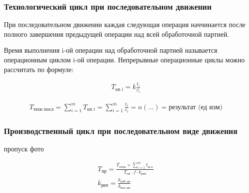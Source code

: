\documentclass[14pt,a4paper,oneside]{extarticle}
\begin{document}
\subsubsection{Технологический цикл при последовательном движении}

При последовательном движении каждая следующая операция наччинается после полного завершения предыдущей операции над всей обработочной партией.

Время выполнения i-ой операции над обработочной партией называется операционным циклом i-ой операции. Непрерывные операционные циклы можно рассчитать по формуле:

\begin{gather*}
    T_\text{оп i}=k\frac{t_i}{c_i}
\end{gather*}

\begin{gather*}
    T_\text{техн посл}=\sum_{i=1}^{m}T_\text{оп i}=\sum_{i=1}^{m}\frac{t_i}{c_i}=n(\ldots)=\text{результат (ед изм)}
\end{gather*}

\subsubsection{Производственный цикл при последовательном виде движения}

пропуск фото

\begin{gather*}
    T_\text{пр}=\frac{T_\text{техн}+\sum_{i=1}^{m}t_\text{м.о.}}{T_\text{см}\cdot f\cdot k_\text{реп}}\\
    k_\text{реп}=\frac{k_\text{раб дн}}{k_\text{кал дн}}
\end{gather*}
\end{document}
